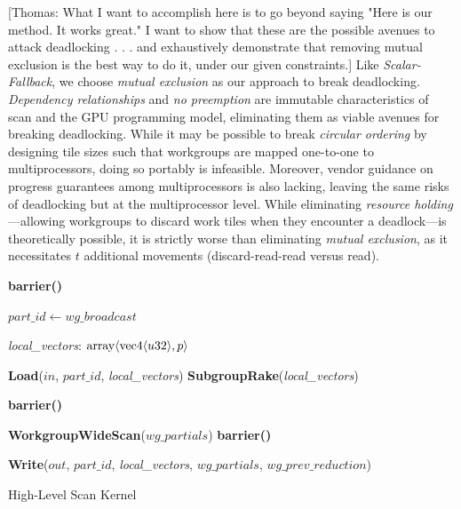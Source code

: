 \documentclass[sigconf]{acmart}
\newcommand{\thomas}[1]{{\footnotesize\color{orange}[Thomas: #1]}}
\begin{document}
\thomas{What I want to accomplish here is to go beyond saying "Here is our method. It works great." I want to show that these are the possible avenues to attack deadlocking . . . and exhaustively demonstrate that removing mutual exclusion is the best way to do it, under our given constraints.}
Like \emph{Scalar-Fallback}, we choose \emph{mutual exclusion} as our approach to break deadlocking. \emph{Dependency relationships} and \emph{no preemption} are immutable characteristics of scan and the GPU programming model, eliminating them as viable avenues for breaking deadlocking. While it may be possible to break \emph{circular ordering} by designing tile sizes such that workgroups are mapped one-to-one to multiprocessors, doing so portably is infeasible. Moreover, vendor guidance on progress guarantees among multiprocessors is also lacking, leaving the same risks of deadlocking but at the multiprocessor level. While eliminating \emph{resource holding}---allowing workgroups to discard work tiles when they encounter a deadlock---is theoretically possible, it is strictly worse than eliminating \emph{mutual exclusion}, as it necessitates $t$ additional movements (discard-read-read versus read).
\begin{algorithm}[htb]
  \small
  \SetAlgoLined

  \textbf{barrier()}\;

  $part\_id \gets wg\_broadcast$\;

  \textit{local\_vectors}: $\textnormal{array}\langle \textnormal{vec4}\langle u32\rangle, p\rangle$\;

  \textbf{Load}($in$, $part\_id$, \textit{local\_vectors})\;
  \textbf{SubgroupRake}(\textit{local\_vectors})\;

  \textbf{barrier()}\;

  \textbf{WorkgroupWideScan}($wg\_partials$)\;
  \textbf{barrier()}\;


  \textbf{Write}($out$, $part\_id$, \textit{local\_vectors}, $wg\_partials$, $wg\_prev\_reduction$)\;

  \caption{High-Level Scan Kernel}
\end{algorithm}
\end{document}
